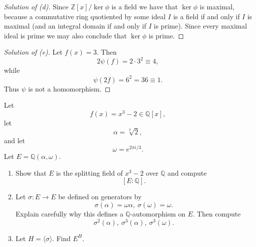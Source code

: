 \begin{proof}[Solution of (d)]
    Since $\mathbb Z[x]/\ker \phi$ is a field 
    we have that $\ker \phi$ is maximal, because 
    a commutative ring quotiented by some ideal $I$ is 
    a field if and only if $I$ is maximal (and 
    an integral domain if and only if $I$ is prime). 
    Since every maximal ideal is prime we may also conclude 
    that $\ker \phi$ is prime.
\end{proof}
\begin{proof}[Solution of (e)]
    Let $f(x) = 3$. Then 
    \[
        2\psi(f) = 2\cdot3^2 \equiv  4,
    \]
    while
    \[
        \psi(2f) = 6^2 = 36 \equiv 1. 
    \]
    Thus $\psi$ is not a homomorphism.
\end{proof}

\begin{prob}
    Let 
    \[
        f(x) = x^3 - 2 \in \mathbb Q[x], 
    \]
    let 
    \[
        \alpha = \sqrt[3]2,
    \]
    and let 
    \[
        \omega = e^{2\pi i / 3}. 
    \]
    Let $E = \mathbb Q(\alpha, \omega)$. 
    \begin{enumerate}[label=\alph*)]
        \item Show that $E$ is the splitting field of 
            $x^3 - 2$ over $\mathbb Q$ and compute 
            \[
                [E : \mathbb Q]. 
            \]
        \item Let $\sigma : E \to E$ be defined on generators 
            by 
            \[
                \sigma(\alpha) = \omega\alpha, \ \sigma(\omega) 
                = \omega. 
            \]
            Explain carefully why this defines a $\mathbb Q$-automorphism 
            on $E$. Then compute 
            \[
                \sigma^2(\alpha), \ \sigma^3(\alpha), \ \sigma^3(\omega). 
            \]
        \item[f)] Let $H = \langle \sigma \rangle$.  
            Find $E^H$.
    \end{enumerate}
\end{prob}
